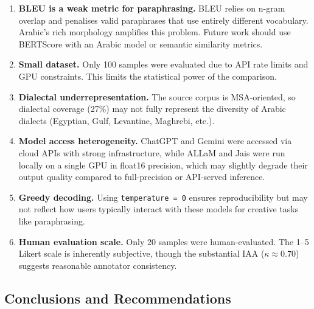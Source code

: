 \documentclass[12pt, a4paper]{article}
\begin{document}
\begin{enumerate}
    \item \textbf{BLEU is a weak metric for paraphrasing.}
          BLEU relies on n-gram overlap and penalises valid paraphrases that use
          entirely different vocabulary.  Arabic's rich morphology amplifies this
          problem.  Future work should use BERTScore with an Arabic model or
          semantic similarity metrics.

    \item \textbf{Small dataset.}
          Only 100 samples were evaluated due to API rate limits and GPU
          constraints.  This limits the statistical power of the comparison.

    \item \textbf{Dialectal underrepresentation.}
          The source corpus is MSA-oriented, so dialectal coverage (27\%) may
          not fully represent the diversity of Arabic dialects (Egyptian,
          Gulf, Levantine, Maghrebi, etc.).

    \item \textbf{Model access heterogeneity.}
          ChatGPT and Gemini were accessed via cloud APIs with strong
          infrastructure, while ALLaM and Jais were run locally on a single
          GPU in float16 precision, which may slightly degrade their output
          quality compared to full-precision or API-served inference.

    \item \textbf{Greedy decoding.}
          Using \texttt{temperature = 0} ensures reproducibility but may not
          reflect how users typically interact with these models for creative
          tasks like paraphrasing.

    \item \textbf{Human evaluation scale.}
          Only 20 samples were human-evaluated.  The 1--5 Likert scale is
          inherently subjective, though the substantial IAA ($\kappa \approx 0.70$)
          suggests reasonable annotator consistency.
\end{enumerate}

\subsection{Conclusions and Recommendations}
\end{document}
